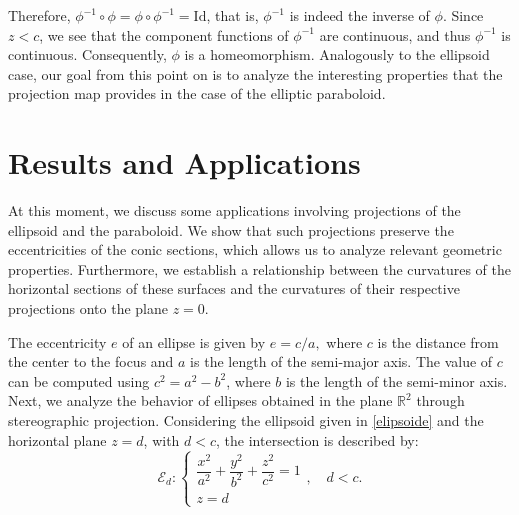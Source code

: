 \documentclass{amsart}
\theoremstyle{plain}
\numberwithin{equation}{section}
\begin{document}
\noindent Therefore, $\phi^{-1} \circ \phi = \phi \circ \phi^{-1} = \mathrm{Id}$, that is, $\phi^{-1}$ is indeed the inverse of $\phi$. Since $z < c$, we see that the component functions of $\phi^{-1}$ are continuous, and thus $\phi^{-1}$ is continuous. Consequently, $\phi$ is a homeomorphism. Analogously to the ellipsoid case, our goal from this point on is to analyze the interesting properties that the projection map provides in the case of the elliptic paraboloid.


\section{Results and Applications}\label{section4}

At this moment, we discuss some applications involving projections of the ellipsoid and the paraboloid. We show that such projections preserve the eccentricities of the conic sections, which allows us to analyze relevant geometric properties. Furthermore, we establish a relationship between the curvatures of the horizontal sections of these surfaces and the curvatures of their respective projections onto the plane \( z = 0 \).

\vspace{0.5cm}

\begin{center}
	\centering
	\footnotesize
\end{center}

The eccentricity $e$ of an ellipse is given by $e = {c}/{a},$ where $c$ is the distance from the center to the focus and $a$ is the length of the semi-major axis. The value of $c$ can be computed using $c^2 = a^2 - b^2$, where $b$ is the length of the semi-minor axis. Next, we analyze the behavior of ellipses obtained in the plane $\mathbb{R}^2$ through stereographic projection. Considering the ellipsoid given in \eqref{elipsoide} and the horizontal plane $z = d$, with $d < c$, the intersection is described by:
\begin{equation*}
	\mathcal{E}_d: 
	\begin{cases}
		\dfrac{x^2}{a^2} + \dfrac{y^2}{b^2} + \dfrac{z^2}{c^2} = 1 \\
		z = d
	\end{cases}, \quad d < c.
\end{equation*}
\end{document}
